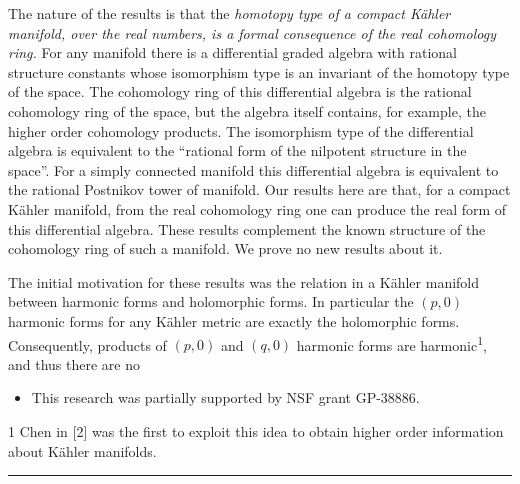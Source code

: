 \documentclass[
  english,
  a3paper,
  a3paper]{extarticle}
\providecommand{\tightlist}{%
  \setlength{\itemsep}{0pt}\setlength{\parskip}{0pt}}
\begin{document}
The nature of the results is that the \emph{homotopy type of a compact
Kähler manifold, over the real numbers, is a formal consequence of the
real cohomology ring.} For any manifold there is a differential graded
algebra with rational structure constants whose isomorphism type is an
invariant of the homotopy type of the space. The cohomology ring of this
differential algebra is the rational cohomology ring of the space, but
the algebra itself contains, for example, the higher order cohomology
products. The isomorphism type of the differential algebra is equivalent
to the ``rational form of the nilpotent structure in the space''. For a
simply connected manifold this differential algebra is equivalent to the
rational Postnikov tower of manifold. Our results here are that, for a
compact Kähler manifold, from the real cohomology ring one can produce
the real form of this differential algebra. These results complement the
known structure of the cohomology ring of such a manifold. We prove no
new results about it.

The initial motivation for these results was the relation in a Kähler
manifold between harmonic forms and holomorphic forms. In particular the
\((p,0)\) harmonic forms for any Kähler metric are exactly the
holomorphic forms. Consequently, products of \((p,0)\) and \((q,0)\)
harmonic forms are harmonic\textsuperscript{1}, and thus there are no

\begin{itemize}
\tightlist
\item
  This research was partially supported by NSF grant GP-38886.
\end{itemize}

1 Chen in {[}2{]} was the first to exploit this idea to obtain higher
order information about Kähler manifolds.

\clearpage



\par

\vspace{0.7mm}\hrule\vspace{1.6mm}

\fontsize{9}{11}\selectfont
\end{document}
